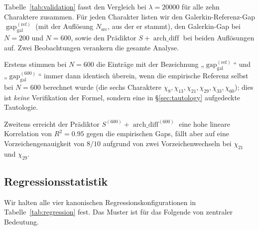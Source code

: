 \documentclass[a4paper,10pt,twocolumn]{article}
\theoremstyle{definition}
\theoremstyle{remark}
\newcommand{\gap}{\operatorname{gap}}
\newcommand{\chifn}{\chi}
\newcommand{\archdiff}{\operatorname{arch\_diff}}
\begin{document}
Tabelle~\ref{tab:validation} fasst den Vergleich bei $\lambda=
20000$ für alle zehn Charaktere zusammen. Für jeden Charakter listen wir den
Galerkin-Referenz-Gap $\gap_{\mathrm{gal}}^{(\mathrm{ref})}$ (mit der Auflösung
$N_{\mathrm{src}}$, aus der er stammt), den Galerkin-Gap bei
$N=200$ und $N=600$, sowie den Prädiktor $S+\archdiff$ bei beiden
Auflösungen auf. Zwei Beobachtungen verankern die gesamte Analyse.

Erstens stimmen bei $N=600$ die Einträge mit der Bezeichnung „$\gap_{\mathrm{gal}}^{(\mathrm{ref})}$“ und
„$\gap_{\mathrm{gal}}^{(600)}$“ immer dann identisch überein, wenn die
empirische Referenz selbst bei $N=600$ berechnet wurde (die sechs
Charaktere $\chifn_8,\chifn_{13},\chifn_{21},\chifn_{29},\chifn_{33},
\chifn_{60}$); dies ist \emph{keine} Verifikation der Formel, sondern
eine in \S\ref{sec:tautology} aufgedeckte Tautologie.

Zweitens erreicht der Prädiktor $S^{(600)}+\archdiff^{(600)}$ eine hohe
lineare Korrelation von $R^2=0.95$ gegen die empirischen Gaps, fällt aber auf
eine Vorzeichengenauigkeit von $8/10$ aufgrund von zwei Vorzeichenwechseln bei $\chifn_{21}$
und $\chifn_{29}$.

\subsection{Regressionsstatistik}
\label{sec:validation-regression}

Wir halten alle vier kanonischen Regressionskonfigurationen in
Tabelle~\ref{tab:regression} fest. Das Muster ist für das Folgende von zentraler Bedeutung.
\end{document}
